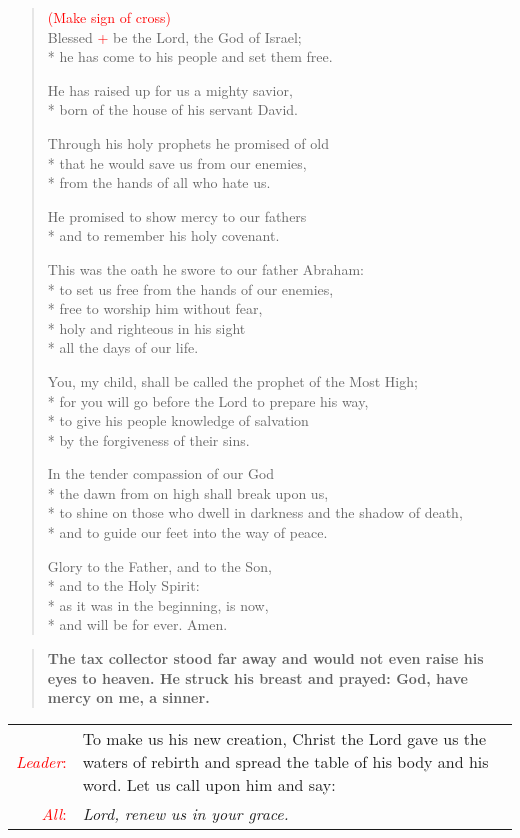 \documentclass[letterpaper,14pt]{extarticle}
\newcommand{\side}[1]{\flagverse{\textcolor{red}{\textit{#1}:}}}
\newcommand{\sidestar}[1]{\textcolor{red}{\textit{#1}:}}
\newcommand{\rednote}[1]{\textcolor{red}{#1}}
\newlength{\oldindent}
\newcommand{\antiphon}[2]{
	\setlength{\oldindent}{\vindent}
	\setlength{\vindent}{0em}
	\begin{verse}
	\side{#1} \textbf{#2}
	\end{verse}
	\setlength{\vindent}{\oldindent}
}
\newcommand{\intercession}[2]{
	\begin{tabular}[h]{r p{4.25in}}
		\sidestar{Leader} & #1 \\
		\sidestar{All} & #2
	\end{tabular}}
\begin{document}
\begin{verse}
\rednote{(Make sign of cross)}\\
\side{All} Blessed \rednote{+} be the Lord, the God of Israel; \\*
he has come to his people and set them free.

He has raised up for us a mighty savior, \\*
born of the house of his servant David.

Through his holy prophets he promised of old \\*
  that he would save us from our enemies, \\*
  from the hands of all who hate us.

He promised to show mercy to our fathers \\*
and to remember his holy covenant.

This was the oath he swore to our father Abraham: \\*
to set us free from the hands of our enemies, \\*
free to worship him without fear, \\*
holy and righteous in his sight \\*
   all the days of our life.

You, my child, shall be called the prophet of the Most High; \\*
for you will go before the Lord to prepare his way, \\*
to give his people knowledge of salvation \\*
by the forgiveness of their sins.

In the tender compassion of our God \\*
the dawn from on high shall break upon us, \\*
to shine on those who dwell in darkness and the shadow of death, \\*
and to guide our feet into the way of peace.

Glory to the Father, and to the Son, \\*
and to the Holy Spirit: \\*
as it was in the beginning, is now, \\*
and will be for ever. Amen.
\end{verse}
\antiphon{All}{The tax collector stood far away and would not even raise his eyes to heaven. He struck his breast and prayed: God, have mercy on me, a sinner.}
\intercession{To make us his new creation, Christ the Lord gave us the waters of rebirth and spread the table of his body and his word. Let us call upon him and say:}
{\textit{Lord, renew us in your grace.}}
\end{document}
